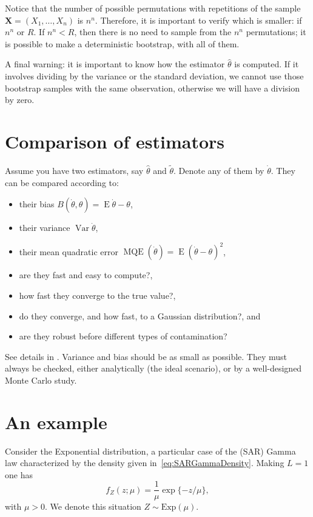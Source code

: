 Notice that the number of possible permutations with repetitions of the sample $\bm X=(X_1,\dots,X_n)$ is $n^n$.
Therefore, it is important to verify which is smaller: if $n^n$ or $R$.
If $n^n < R$, then there is no need to sample from the $n^n$ permutations; it is possible to make a deterministic bootstrap, with all of them.

A final warning: it is important to know how the estimator $\widehat{\theta}$ is computed.
If it involves dividing by the variance or the standard deviation, we cannot use those bootstrap samples with the same observation, otherwise we will have a division by zero.

\section{Comparison of estimators}

Assume you have two estimators, say $\widehat{\theta}$ and $\widetilde{\theta}$.
Denote any of them by $\dot\theta$.
They can be compared according to:
\begin{itemize}
\item their bias $B(\dot{\theta},\theta)=\operatorname{E}\dot\theta-\theta$,
\item their variance $\operatorname{Var}\dot{\theta}$,
\item their mean quadratic error $\operatorname{MQE}(\dot{\theta}) = \operatorname{E}(\dot{\theta}-\theta)^2$,
\item are they fast and easy to compute?,
\item how fast they converge to the true value?,
\item do they converge, and how fast, to a Gaussian distribution?, and
\item are they robust before different types of contamination?
\end{itemize}
See details in \citet{busto92}.
Variance and bias should be as small as possible.
They must always be checked, either analytically (the ideal scenario), or by a well-designed Monte Carlo study.

\section{An example}\label{Sec:ExampleExponentialDistribution}

Consider the Exponential distribution, a particular case of the (SAR) Gamma law characterized by the density given in~\eqref{eq:SARGammaDensity}.
Making $L=1$ one has
\begin{equation}
f_Z(z;\mu) = \frac{1}{\mu} \exp\{-z/\mu\},
\label{eq:ExpDensity}
\end{equation}
with $\mu>0$.
We denote this situation $Z\sim \text{Exp}(\mu)$.

